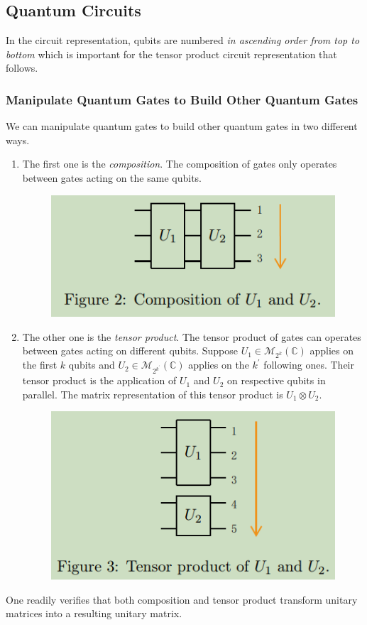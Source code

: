 \subsection{Quantum Circuits}

In the circuit representation, qubits are numbered \textit{in ascending order from top to bottom} which is important for the tensor product circuit representation that follows. %

\subsubsection{Manipulate Quantum Gates to Build Other Quantum Gates}

We can manipulate quantum gates to build other quantum gates in two different ways. 
\begin{enumerate}
    \item The first one is the \textit{composition}. The composition of gates only operates between gates acting on the same qubits. 
\begin{figure}[h]
    \centering
    \includegraphics[width=0.5\linewidth]{Images/grange2023-1.png}
\end{figure}
    \item The other one is the \textit{tensor product}. The tensor product of gates can operates between gates acting on different qubits. Suppose $U_{1} \in \mathcal{M}_{2^{k}}(\mathbb{C})$ applies on the first $k$ qubits and $U_{2} \in \mathcal{M}_{2^{k^{\prime}}}(\mathbb{C})$ applies on the $k^{\prime}$ following ones. Their tensor product is the application of $U_{1}$ and $U_{2}$ on respective qubits in parallel. The matrix representation of this tensor product is $U_{1} \otimes U_{2}$. 
\begin{figure}[h]
    \centering
    \includegraphics[width=0.5\linewidth]{Images/grange2023-2.png}
\end{figure}
\end{enumerate}
One readily verifies that both composition and tensor product transform unitary matrices into a resulting unitary matrix.


